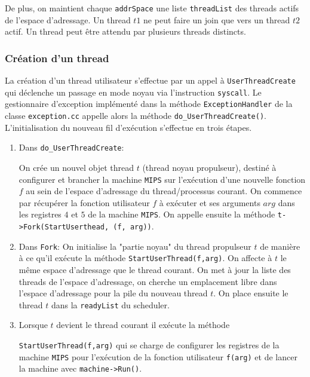 \documentclass[11pt]{article}
\theoremstyle{definition}
\theoremstyle{definition}
\begin{document}
De plus, on maintient chaque \texttt{addrSpace} une liste \texttt{threadList} des threads actifs de l'espace d'adressage.
Un thread $t1$ ne peut faire un join que vers un thread $t2$ actif.
Un thread peut être attendu par plusieurs threads distincts.

\subsubsection{Création d'un thread}
La création d'un thread utilisateur s'effectue par un appel à \texttt{UserThreadCreate}
qui déclenche un passage en mode noyau via l'instruction \texttt{syscall}.
Le gestionnaire d'exception implémenté dans la méthode \texttt{ExceptionHandler} de la classe
\texttt{exception.cc} appelle alors la méthode \texttt{do\_UserThreadCreate()}.
L'initialisation du nouveau fil d'exécution s'effectue en trois étapes.

\begin{enumerate}
\item Dans \texttt{do\_UserThreadCreate}:

On crée un nouvel objet thread $t$ (thread noyau propulseur), destiné à configurer et brancher la machine \texttt{MIPS} sur l'exécution d'une nouvelle fonction $f$ au sein de l'espace d'adressage du thread/processus courant.
On commence par récupérer la fonction utilisateur $f$ à exécuter et ses arguments $arg$ dans les registres $4$ et $5$ de la machine \texttt{MIPS}. On appelle ensuite la méthode \texttt{t->Fork(StartUserthead, (f, arg))}.

\item Dans \texttt{Fork}:
On initialise la "partie noyau" du thread propulseur $t$ de manière
à ce qu'il exécute la méthode \texttt{StartUserThread(f,arg)}. On affecte à $t$ le même espace d'adressage que le thread courant. On met à jour la liste des threads de l'espace d'adressage, on cherche un emplacement
libre dans l'espace d'adressage pour la pile du nouveau thread $t$.
On place ensuite le thread $t$ dans la \texttt{readyList} du scheduler.

\item Lorsque $t$ devient le thread courant il exécute la méthode

  \texttt{StartUserThread(f,arg)}
qui se charge de configurer les registres de la machine \texttt{MIPS} pour l'exécution
de la fonction utilisateur \texttt{f(arg)} et de lancer la machine avec \texttt{machine->Run()}. 
\end{enumerate}
\end{document}
